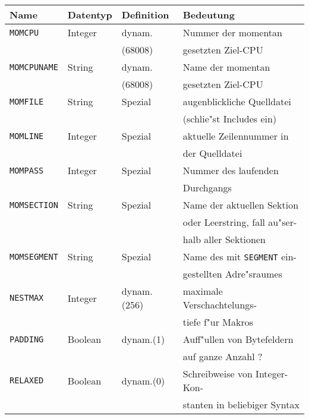 \documentclass[12pt,a4paper,twoside]{report}
\newcommand{\tty}[1]{{\tt #1}}
\begin{document}
\begin{table*}
\begin{center}\begin{tabular}{|l|l|l|l|}
\hline
Name             &  Datentyp   & Definition & Bedeutung \\
\hline\hline
\tty{MOMCPU}     &  Integer    & dynam.     & Nummer der momentan \\
                 &             & (68008)    & gesetzten Ziel-CPU \\
\hline
\tty{MOMCPUNAME} &  String     & dynam.     & Name der momentan \\
                 &             & (68008)    & gesetzten Ziel-CPU \\
\hline
\tty{MOMFILE}    &  String     & Spezial    & augenblickliche Quelldatei \\
                 &             &            & (schlie"st Includes ein) \\
\hline
\tty{MOMLINE}    &  Integer    & Spezial    & aktuelle Zeilennummer in \\
                 &             &            & der Quelldatei \\
\hline
\tty{MOMPASS}    &  Integer    & Spezial    & Nummer des laufenden \\
                 &             &            & Durchgangs \\
\hline
\tty{MOMSECTION} &  String     & Spezial    & Name der aktuellen Sektion \\
                 &             &            & oder Leerstring, fall au"ser- \\
                 &             &            & halb aller Sektionen \\
\hline
\tty{MOMSEGMENT} &  String     & Spezial    & Name des mit \tty{SEGMENT} ein- \\
                 &             &            & gestellten Adre"sraumes \\
\hline
\tty{NESTMAX}    &  Integer    & dynam.(256)& maximale Verschachtelungs- \\
                 &             &            & tiefe f"ur Makros \\
\hline
\tty{PADDING}    &  Boolean    & dynam.(1)  & Auff"ullen von Bytefeldern \\
                 &             &            & auf ganze Anzahl ? \\
\hline
\tty{RELAXED}    &  Boolean    & dynam.(0)  & Schreibweise von Integer-Kon- \\
                 &             &            & stanten in beliebiger Syntax \\

\end{tabular}
\end{center}
\end{table*}
\end{document}
